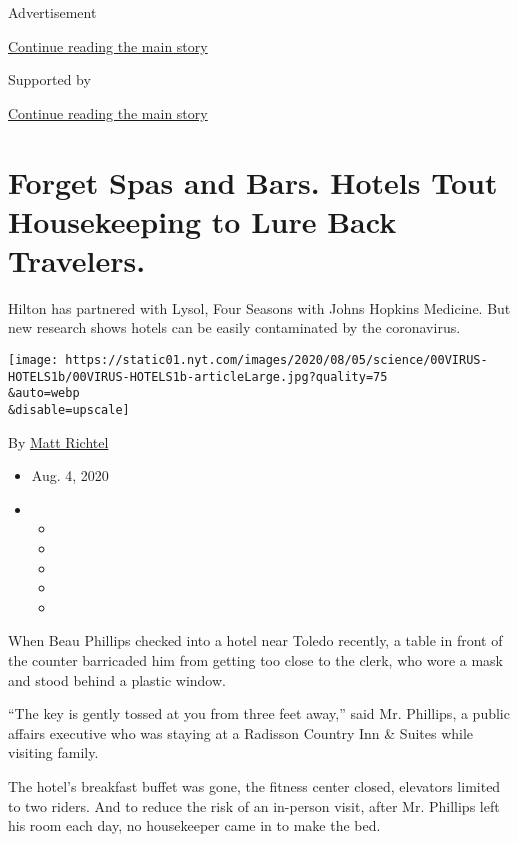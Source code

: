 Advertisement

\protect\hyperlink{after-top}{Continue reading the main story}

Supported by

\protect\hyperlink{after-sponsor}{Continue reading the main story}

\hypertarget{forget-spas-and-bars-hotels-tout-housekeeping-to-lure-back-travelers}{%
\section{Forget Spas and Bars. Hotels Tout Housekeeping to Lure Back
Travelers.}\label{forget-spas-and-bars-hotels-tout-housekeeping-to-lure-back-travelers}}

Hilton has partnered with Lysol, Four Seasons with Johns Hopkins
Medicine. But new research shows hotels can be easily contaminated by
the coronavirus.

\texttt{[image: https://static01.nyt.com/images/2020/08/05/science/00VIRUS-HOTELS1b/00VIRUS-HOTELS1b-articleLarge.jpg?quality=75\\\&auto=webp\\\&disable=upscale]}

By \href{https://www.nytimes.com/by/matt-richtel}{Matt Richtel}

\begin{itemize}
\item
  Aug. 4, 2020
\item
  \begin{itemize}
  \item
  \item
  \item
  \item
  \item
  \end{itemize}
\end{itemize}

When Beau Phillips checked into a hotel near Toledo recently, a table in
front of the counter barricaded him from getting too close to the clerk,
who wore a mask and stood behind a plastic window.

``The key is gently tossed at you from three feet away,'' said Mr.
Phillips, a public affairs executive who was staying at a Radisson
Country Inn \& Suites while visiting family.

The hotel's breakfast buffet was gone, the fitness center closed,
elevators limited to two riders. And to reduce the risk of an in-person
visit, after Mr. Phillips left his room each day, no housekeeper came in
to make the bed.

